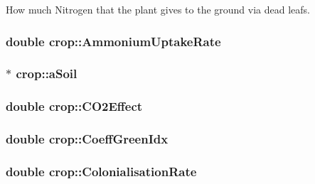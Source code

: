 How much Nitrogen that the plant gives to the ground via dead leafs. \hypertarget{classcrop_a1707be6e4080e9ca3c3f24d6ffe0d6fa}{
\subsubsection[{AmmoniumUptakeRate}]{\setlength{\rightskip}{0pt plus 5cm}double {\bf crop::AmmoniumUptakeRate}}}
\label{classcrop_a1707be6e4080e9ca3c3f24d6ffe0d6fa}
\hypertarget{classcrop_aaf7bdd66e714b1ad4057bad5a46e6772}{
\subsubsection[{aSoil}]{$\ast$ {\bf crop::aSoil}}}
\label{classcrop_aaf7bdd66e714b1ad4057bad5a46e6772}
\hypertarget{classcrop_a40992582378c797a8b5a4b8d9aef6d2b}{
\subsubsection[{CO2Effect}]{\setlength{\rightskip}{0pt plus 5cm}double {\bf crop::CO2Effect}}}
\label{classcrop_a40992582378c797a8b5a4b8d9aef6d2b}
\hypertarget{classcrop_a668a3be41e3f465357ee7ad27e261a02}{
\subsubsection[{CoeffGreenIdx}]{\setlength{\rightskip}{0pt plus 5cm}double {\bf crop::CoeffGreenIdx}}}
\label{classcrop_a668a3be41e3f465357ee7ad27e261a02}
\hypertarget{classcrop_a787dec1e35057a17b4837bc01fc34350}{
\subsubsection[{ColonialisationRate}]{\setlength{\rightskip}{0pt plus 5cm}double {\bf crop::ColonialisationRate}}}
